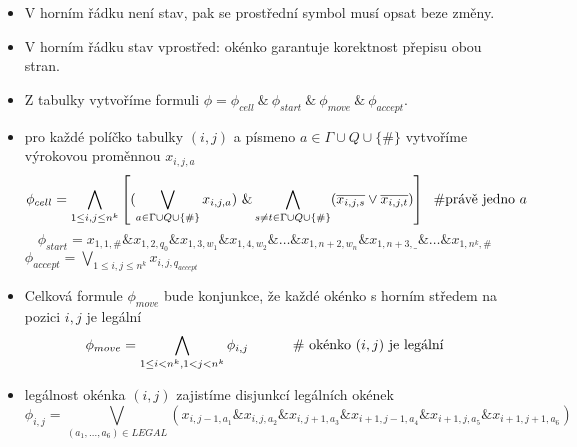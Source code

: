 \begin{frame}{}
\begin{proofm}{}
\begin{itemize}
\begin{itemize}
        \begin{itemize}
            \item V horním řádku není stav, pak se prostřední symbol musí opsat beze změny.
            \item V horním řádku stav vprostřed: okénko garantuje korektnost přepisu obou stran.
        \end{itemize}
    \end{itemize}
        
        
    \end{itemize}
    \end{proofm}
    \end{frame}
    
    
    \begin{frame}{}
    \begin{proofe}
    \begin{itemize}
        \item Z tabulky vytvoříme formuli $\phi=\phi_{cell}\ \&\ \phi_{start}\ \&\ \phi_{move}\ \&\  \phi_{accept}$.
        \item pro každé políčko tabulky $(i,j) $ a písmeno $a\in \Gamma\cup Q \cup \{\#\}$ vytvoříme výrokovou proměnnou $x_{i,j,a}$
        $$
        \phi_{cell}=\bigwedge_{1\leq i,j \leq n^k} \left[ (\bigvee_{a \in \Gamma\cup Q \cup \{\#\}} x_{i,j,a}) \ 
        \&\bigwedge_{s\neq t\in \Gamma\cup Q \cup \{\#\}} (\overline{x_{i,j,s}}\vee \overline{x_{i,j,t}})\right]\hbox{\hspace{0.1cm}   \#právě jedno $a$}
        $$
        $$\phi_{start}= x_{1,1,\#}\& x_{1,2,q_0} \& x_{1,3,w_1}\& x_{1,4,w_2}\& \ldots \& x_{1,n+2,w_n}\& x_{1,n+3,\_}\&\ldots \& x_{1,n^k,\#}
        $$
    $\phi_{accept}= \bigvee_{1\leq i,j \leq n^k} x_{i,j,q_{accept}}
    $
        \item Celková formule $\phi_{move}$ bude konjunkce, že každé okénko s horním středem na pozici $i,j$ je legální
    $$\phi_{move}=\bigwedge_{1\leq i < n^k, 1<j<n^k} \phi_{i,j}\hbox{\hspace{1cm}   \# okénko $(i,j)$ je legální}
    $$
    \item  legálnost okénka $(i,j)$ zajistíme disjunkcí legálních okének
    $$\phi_{i,j}=\bigvee_{(a_1,\ldots,a_6) \in LEGAL} (x_{i,j-1,a_1}\& x_{i,j,a_2}\& x_{i,j+1,a_3}\& 
    x_{i+1,j-1,a_4}\& x_{i+1,j,a_5}\& x_{i+1,j+1,a_6} )
    $$
    \end{itemize}
    \end{proofe}
    \end{frame}
    

